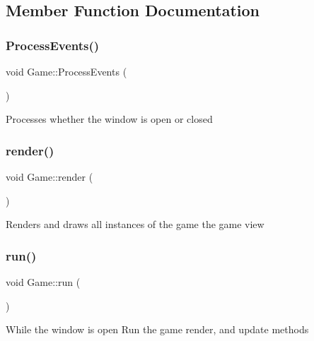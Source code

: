 \subsection{Member Function Documentation}
\mbox{\label{class_game_ae7e28abc55af4902c9c39899708d08d7}} 
\subsubsection{\texorpdfstring{ProcessEvents()}{ProcessEvents()}}
{\footnotesize\ttfamily void Game\+::\+Process\+Events (\begin{DoxyParamCaption}{ }\end{DoxyParamCaption})\hspace{0.3cm}{\ttfamily [private]}}



Processes whether the window is open or closed 

\mbox{\label{class_game_a15ddd769261d923827a3cdf41499c843}} 
\subsubsection{\texorpdfstring{render()}{render()}}
{\footnotesize\ttfamily void Game\+::render (\begin{DoxyParamCaption}{ }\end{DoxyParamCaption})\hspace{0.3cm}{\ttfamily [private]}}



Renders and draws all instances of the game the game view 

\mbox{\label{class_game_a1ab78f5ed0d5ea879157357cf2fb2afa}} 
\subsubsection{\texorpdfstring{run()}{run()}}
{\footnotesize\ttfamily void Game\+::run (\begin{DoxyParamCaption}{ }\end{DoxyParamCaption})}



While the window is open Run the game render, and update methods 

